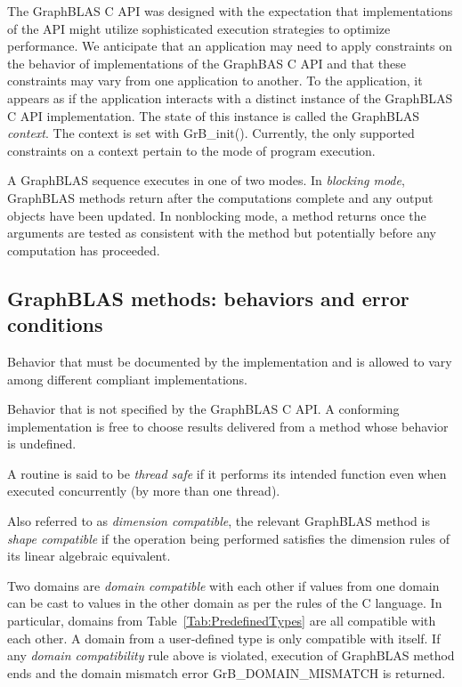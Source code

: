  The GraphBLAS C API was designed with the expectation that
implementations of the API might utilize sophisticated execution strategies 
to optimize performance.   We anticipate that an application may need 
to apply constraints on the behavior of implementations of the 
GraphBAS C API and that these constraints may vary from one application 
to another.   To the application, it appears as if the application 
interacts with a distinct instance of the GraphBLAS C API implementation.
The state of this instance is called the GraphBLAS \emph{context}. 
The context  is set with {\sf GrB\_init()}. Currently, the only
supported constraints on a context pertain to the mode of program execution.

 A GraphBLAS sequence executes in one of two modes.  
In \emph{blocking mode}, GraphBLAS methods return after the computations 
complete and any output objects have been updated.  In nonblocking mode, a 
method returns once the arguments are tested as consistent with 
the method but potentially before any computation has proceeded.
\glossEnd

\subsection{GraphBLAS methods: behaviors and error conditions}
\glossBegin
{} Behavior that must be documented
by the implementation and is allowed to vary among different
compliant implementations. 

 Behavior that is not specified by the GraphBLAS C API.
A conforming implementation is free to choose results delivered from a method
whose behavior is undefined. 

 A routine is said to be \emph{thread safe} if it performs its intended 
function even when executed concurrently (by more than one thread).

 Also referred to as \emph{dimension compatible}, the relevant 
GraphBLAS method is \emph{shape compatible} if the operation being 
performed satisfies the dimension rules of its linear algebraic equivalent.

 Two domains are \emph{domain compatible} with 
each other if values from one domain can be cast to values in the other domain 
as per the rules of the C language. In particular, domains from Table~\ref{Tab:PredefinedTypes} 
are all compatible with each other. A domain from a user-defined type is only 
compatible with itself. If any \emph{domain compatibility} rule above is 
violated, execution of GraphBLAS method ends and the domain 
mismatch error {\sf GrB\_DOMAIN\_MISMATCH} is returned.
\glossEnd

